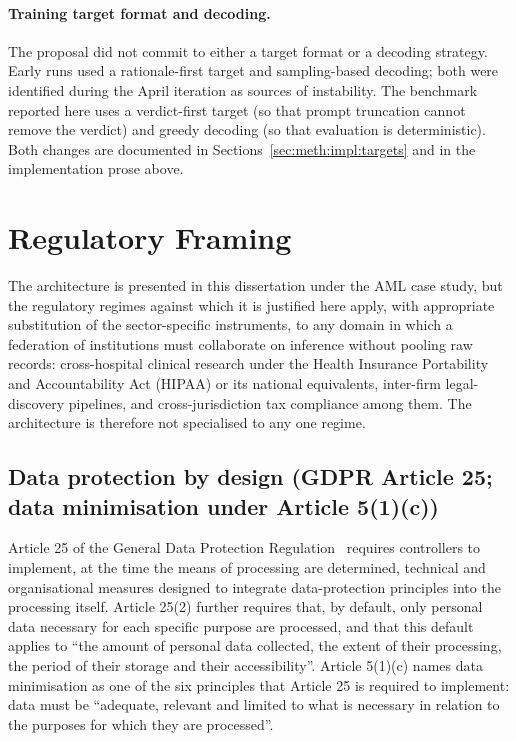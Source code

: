\documentclass{report}
\begin{document}
\paragraph{Training target format and decoding.} The proposal did not commit to either a target format or a decoding strategy. Early runs used a rationale-first target and sampling-based decoding; both were identified during the April iteration as sources of instability. The benchmark reported here uses a verdict-first target (so that prompt truncation cannot remove the verdict) and greedy decoding (so that evaluation is deterministic). Both changes are documented in Sections~\ref{sec:meth:impl:targets} and in the implementation prose above.

\section{Regulatory Framing}
\label{sec:meth:regulatory}

The architecture is presented in this dissertation under the AML case study, but the regulatory regimes against which it is justified here apply, with appropriate substitution of the sector-specific instruments, to any domain in which a federation of institutions must collaborate on inference without pooling raw records: cross-hospital clinical research under the Health Insurance Portability and Accountability Act (HIPAA) or its national equivalents, inter-firm legal-discovery pipelines, and cross-jurisdiction tax compliance among them. The architecture is therefore not specialised to any one regime.

\subsection{Data protection by design (GDPR Article 25; data minimisation under Article 5(1)(c))}

Article 25 of the General Data Protection Regulation~\cite{gdpr2016} requires controllers to implement, at the time the means of processing are determined, technical and organisational measures designed to integrate data-protection principles into the processing itself. Article 25(2) further requires that, by default, only personal data necessary for each specific purpose are processed, and that this default applies to ``the amount of personal data collected, the extent of their processing, the period of their storage and their accessibility''. Article 5(1)(c) names data minimisation as one of the six principles that Article 25 is required to implement: data must be ``adequate, relevant and limited to what is necessary in relation to the purposes for which they are processed''.
\end{document}
